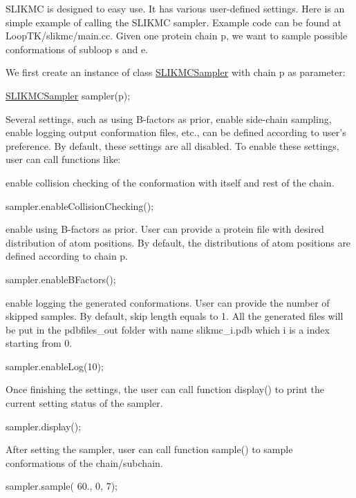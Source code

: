 S\-L\-I\-K\-M\-C is designed to easy use. It has various user-\/defined settings. Here is an simple example of calling the S\-L\-I\-K\-M\-C sampler. Example code can be found at Loop\-T\-K/slikmc/main.\-cc. Given one protein chain p, we want to sample possible conformations of subloop s and e.

We first create an instance of class \hyperlink{classSLIKMCSampler}{S\-L\-I\-K\-M\-C\-Sampler} with chain p as parameter\-:

\hyperlink{classSLIKMCSampler}{S\-L\-I\-K\-M\-C\-Sampler} sampler(p);

Several settings, such as using B-\/factors as prior, enable side-\/chain sampling, enable logging output conformation files, etc., can be defined according to user's preference. By default, these settings are all disabled. To enable these settings, user can call functions like\-:

enable collision checking of the conformation with itself and rest of the chain.

sampler.\-enable\-Collision\-Checking();

enable using B-\/factors as prior. User can provide a protein file with desired distribution of atom positions. By default, the distributions of atom positions are defined according to chain p.

sampler.\-enable\-B\-Factors();

enable logging the generated conformations. User can provide the number of skipped samples. By default, skip length equals to 1. All the generated files will be put in the pdbfiles\-\_\-out folder with name slikmc\-\_\-i.\-pdb which i is a index starting from 0.

sampler.\-enable\-Log(10);

Once finishing the settings, the user can call function display() to print the current setting status of the sampler.

sampler.\-display();

After setting the sampler, user can call function sample() to sample conformations of the chain/subchain.

sampler.\-sample( 60., 0, 7); 
